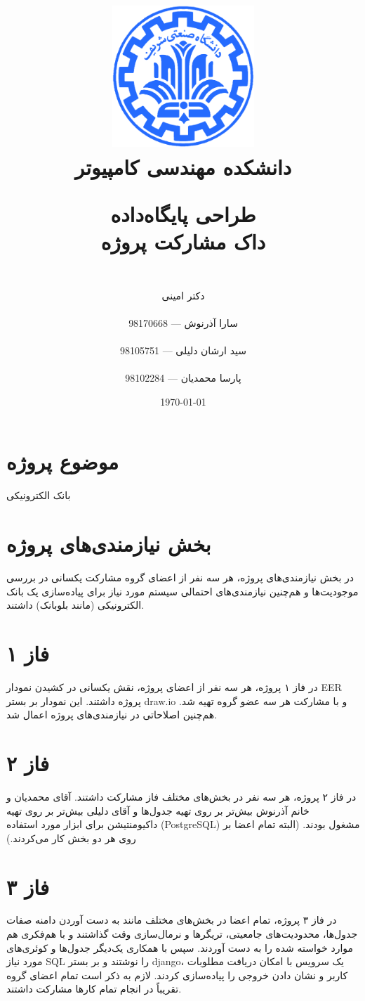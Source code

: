 \documentclass{article}
\title{
\includegraphics[width=0.4\textwidth]{sharif.png}\\
\normalsize{دانشکده مهندسی کامپیوتر}\\
\vspace{1cm}
	
\huge{طراحی پایگاه‌داده}
\\ \vspace{.8cm}
\Large{داک مشارکت پروژه}
}
\author{
\\
دکتر امینی
\\ \vspace{.4cm}
\\
  سارا آذرنوش       ---      98170668
\\ \vspace{0.2cm} \\
  سید ارشان دلیلی       ---      98105751
\\ \vspace{0.2cm} \\
  پارسا محمدیان       ---      98102284
\\ \vspace{.4cm}
}
\date{\today}
\begin{document}
\clearpage
\maketitle
\thispagestyle{empty}

\newpage

\clearpage
\pagestyle{fancy}


\tableofcontents

\newpage

\setcounter{page}{1}

\section{موضوع پروژه}
بانک الکترونیکی

\section{بخش نیازمندی‌های پروژه}
در بخش نیازمندی‌های پروژه، هر سه نفر از اعضای گروه مشارکت یکسانی در بررسی موجودیت‌ها و هم‌چنین نیازمندی‌های احتمالی سیستم مورد نیاز برای پیاده‌سازی یک بانک الکترونیکی (مانند بلوبانک) داشتند.

\section{فاز ۱}
در فاز ۱ پروژه، هر سه نفر از اعضای پروژه، نقش یکسانی در کشیدن نمودار EER پروژه داشتند. این نمودار بر بستر draw.io و با مشارکت هر سه عضو گروه تهیه شد. هم‌چنین اصلاحاتی در نیازمندی‌های پروژه اعمال شد.

\section{فاز ۲}
در فاز ۲ پروژه، هر سه نفر در بخش‌های مختلف فاز مشارکت داشتند. آقای محمدیان و خانم آذرنوش بیش‌تر بر روی تهیه جدول‌ها و آقای دلیلی بیش‌تر بر روی تهیه داکیومنتیشن برای ابزار مورد استفاده (PostgreSQL) مشغول بودند. (البته تمام اعضا بر روی هر دو بخش کار می‌کردند.)

\section{فاز ۳}

در فاز ۳ پروژه، تمام اعضا در بخش‌های مختلف مانند به دست آوردن دامنه صفات جدول‌ها، محدودیت‌های جامعیتی، تریگرها و نرمال‌سازی وقت گذاشتند و با هم‌فکری هم موارد خواسته شده را به دست آوردند. سپس با همکاری یک‌دیگر جدول‌ها و کوئری‌های مورد نیاز SQL را نوشتند و بر بستر django، یک سرویس با امکان دریافت مطلوبات کاربر و نشان دادن خروجی را پیاده‌سازی کردند. لازم به ذکر است تمام اعضای گروه تقریباً در انجام تمام کارها مشارکت داشتند.
\end{document}
